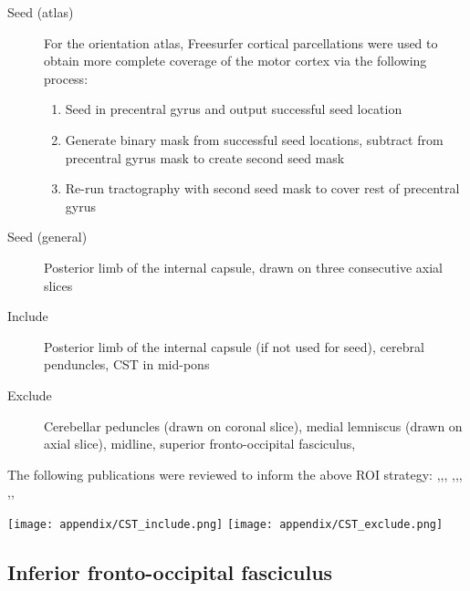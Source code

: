 \begin{description}
  \item[Seed (atlas)] For the orientation atlas, Freesurfer cortical parcellations were used to obtain more complete coverage of the motor cortex via the following process:
  \begin{enumerate}
    \item Seed in precentral gyrus and output successful seed location
    \item Generate binary mask from successful seed locations, subtract from precentral gyrus mask to create second seed mask
    \item Re-run tractography with second seed mask to cover rest of precentral gyrus
  \end{enumerate}
  \item[Seed (general)] Posterior limb of the internal capsule, drawn on three consecutive axial slices
  \item[Include] Posterior limb of the internal capsule (if not used for seed), cerebral penduncles, CST in mid-pons
  \item[Exclude] Cerebellar peduncles (drawn on coronal slice), medial lemniscus (drawn on axial slice), midline, superior fronto-occipital fasciculus,
\end{description}

The following publications were reviewed to inform the above ROI strategy: \textcite{Ciccarelli2006},\textcite{Han2010},\textcite{Hattingen2009a},
\textcite{Niu2016},\textcite{Radmanesh2015},\textcite{Reich2006},
\textcite{Rosenstock2017},\textcite{Szmuda2021},\textcite{Vargas2013}

\begin{figure*}[h]
  \centering
    \texttt{[image: appendix/CST\_include.png]}
    \texttt{[image: appendix/CST\_exclude.png]}
  \caption{Seed (yellow), inclusion (green) and exclusion (red) \glspl{roi} for the corticospinal tract}
  \label{fig:rois.cst}
\end{figure*}

\subsection{Inferior fronto-occipital fasciculus}

